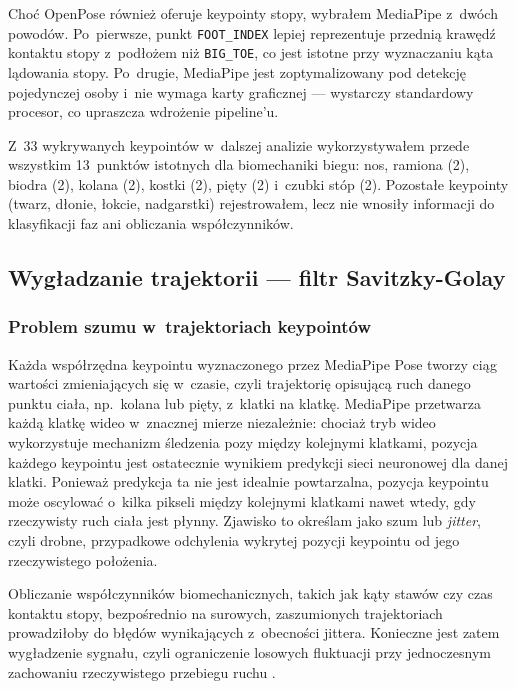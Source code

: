 Choć OpenPose również oferuje keypointy stopy, wybrałem MediaPipe z~dwóch powodów. Po~pierwsze, punkt \texttt{FOOT\_INDEX} lepiej reprezentuje przednią krawędź kontaktu stopy z~podłożem niż \texttt{BIG\_TOE}, co jest istotne przy wyznaczaniu kąta lądowania stopy. Po~drugie, MediaPipe jest zoptymalizowany pod detekcję pojedynczej osoby i~nie wymaga karty graficznej --- wystarczy standardowy procesor, co upraszcza wdrożenie pipeline'u.

Z~33 wykrywanych keypointów w~dalszej analizie wykorzystywałem przede wszystkim 13~punktów istotnych dla biomechaniki biegu: nos, ramiona (2), biodra (2), kolana (2), kostki (2), pięty (2) i~czubki stóp (2). Pozostałe keypointy (twarz, dłonie, łokcie, nadgarstki) rejestrowałem, lecz nie wnosiły informacji do klasyfikacji faz ani obliczania współczynników.

\subsection{Wygładzanie trajektorii --- filtr Savitzky-Golay}
\label{sec:savgol}

\subsubsection{Problem szumu w~trajektoriach keypointów}

Każda współrzędna keypointu wyznaczonego przez MediaPipe Pose tworzy ciąg wartości zmieniających się w~czasie, czyli trajektorię opisującą ruch danego punktu ciała, np.~kolana lub pięty, z~klatki na klatkę. MediaPipe przetwarza każdą klatkę wideo w~znacznej mierze niezależnie: chociaż tryb wideo wykorzystuje mechanizm śledzenia pozy między kolejnymi klatkami, pozycja każdego keypointu jest ostatecznie wynikiem predykcji sieci neuronowej dla danej klatki. Ponieważ predykcja ta nie jest idealnie powtarzalna, pozycja keypointu może oscylować o~kilka pikseli między kolejnymi klatkami nawet wtedy, gdy rzeczywisty ruch ciała jest płynny. Zjawisko to określam jako szum lub \textit{jitter}, czyli drobne, przypadkowe odchylenia wykrytej pozycji keypointu od jego rzeczywistego położenia.

Obliczanie współczynników biomechanicznych, takich jak kąty stawów czy czas kontaktu stopy, bezpośrednio na surowych, zaszumionych trajektoriach prowadziłoby do błędów wynikających z~obecności jittera. Konieczne jest zatem wygładzenie sygnału, czyli ograniczenie losowych fluktuacji przy jednoczesnym zachowaniu rzeczywistego przebiegu ruchu \cite{crenna2021filtering}.

